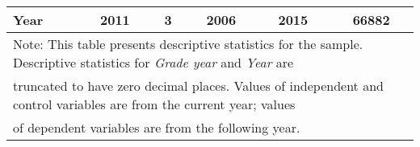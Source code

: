 \begin{table}[htbp]
\begin{tabular}{l*{1}{ccccc}}
\hspace{0.25cm} Year&        2011&           3&        2006&        2015&       66882\\
\bottomrule
\multicolumn{6}{l}{\footnotesize Note: This table presents descriptive statistics for the sample. Descriptive statistics for \emph{Grade year} and \emph{Year} are }\\
\multicolumn{6}{l}{\footnotesize truncated to have zero decimal places. Values of independent and control variables are from the current year; values}\\
\multicolumn{6}{l}{\footnotesize of dependent variables are from the following year.}\\
\end{tabular}
\end{table}
